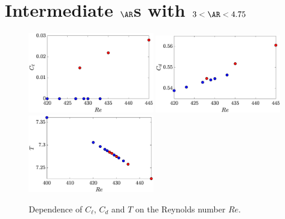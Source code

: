 \section{Intermediate $\AR$s with $3 < \AR < 4.75$}



\begin{figure}
  \centering
  \includegraphics[width=0.49\textwidth]{./fig/AR4_Cl_Re.eps}
  \includegraphics[width=0.49\textwidth]{./fig/AR4_Cd_Re.eps}
  \includegraphics[width=0.49\textwidth]{./fig/AR4_T_Re.eps}
  \caption{Dependence of $C_\ell$, $C_d$ and $T$ on the Reynolds number $Re$.}
  \label{fig:Cl-Cd-AR4}
\end{figure}

